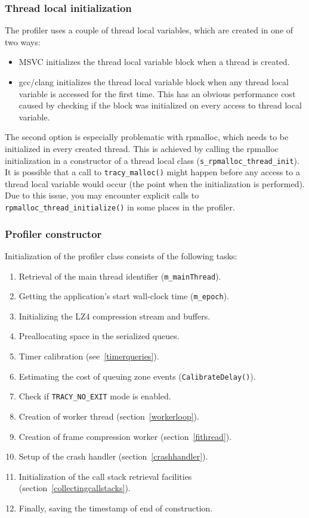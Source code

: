 \documentclass[hidelinks,titlepage,a4paper]{article}
\begin{document}
\subsubsection{Thread local initialization}

The profiler uses a couple of thread local variables, which are created in one of two ways:

\begin{itemize}
\item MSVC initializes the thread local variable block when a thread is created.
\item gcc/clang initializes the thread local variable block when any thread local variable is accessed for the first time. This has an obvious performance cost caused by checking if the block was initialized on every access to thread local variable.
\end{itemize}

The second option is especially problematic with rpmalloc, which needs to be initialized in every created thread. This is achieved by calling the rpmalloc initialization in a constructor of a thread local class (\texttt{s\_rpmalloc\_thread\_init}). It is possible that a call to \texttt{tracy\_malloc()} might happen before any access to a thread local variable would occur (the point when the initialization is performed). Due to this issue, you may encounter explicit calls to \texttt{rpmalloc\_thread\_initialize()} in some places in the profiler.

\subsubsection{Profiler constructor}

Initialization of the profiler class consists of the following tasks:

\begin{enumerate}
\item Retrieval of the main thread identifier (\texttt{m\_mainThread}).
\item Getting the application's start wall-clock time (\texttt{m\_epoch}).
\item Initializing the LZ4 compression stream and buffers.
\item Preallocating space in the serialized queues.
\item Timer calibration (see~\ref{timerqueries}).
\item Estimating the cost of queuing zone events (\texttt{CalibrateDelay()}).
\item Check if \texttt{TRACY\_NO\_EXIT} mode is enabled.
\item Creation of worker thread (section~\ref{workerloop}).
\item Creation of frame compression worker (section~\ref{fithread}).
\item Setup of the crash handler (section~\ref{crashhandler}).
\item Initialization of the call stack retrieval facilities (section~\ref{collectingcallstacks}).
\item Finally, saving the timestamp of end of construction.
\end{enumerate}
\end{document}
